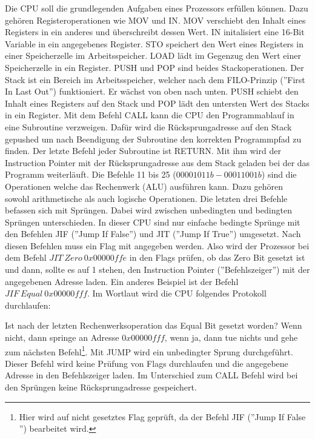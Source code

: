\documentclass[12pt]{article}
\begin{document}
\newpage
\noindent Die CPU soll die grundlegenden Aufgaben eines Prozessors erfüllen können. Dazu gehören Registeroperationen wie MOV und IN. MOV verschiebt den Inhalt eines Registers in ein anderes und überschreibt dessen Wert. IN initalisiert eine 16-Bit Variable in ein angegebenes Register. STO speichert den Wert eines Registers in einer Speicherzelle im Arbeitsspeicher. LOAD lädt im Gegenzug den Wert einer Speicherzelle in ein Register. PUSH und POP sind beides Stackoperationen. Der Stack ist ein Bereich im Arbeitsspeicher, welcher nach dem FILO-Prinzip (''First In Last Out'') funktioniert. Er wächst von oben nach unten. PUSH schiebt den Inhalt eines Registers auf den Stack und POP lädt den untersten Wert des Stacks in ein Register. Mit dem Befehl CALL kann die CPU den Programmablauf in eine Subroutine verzweigen. Dafür wird die Rücksprungadresse auf den Stack gepushed um nach Beendigung der Subroutine den korrekten Programmpfad zu finden. Der letzte Befehl jeder Subroutine ist RETURN. Mit ihm wird der Instruction Pointer mit der Rücksprungadresse aus dem Stack geladen bei der das Programm weiterläuft. Die Befehle 11 bis 25 ($00001011b - 00011001b$) sind die Operationen welche das Rechenwerk (ALU) ausführen kann. Dazu gehören sowohl arithmetische als auch logische Operationen. Die letzten drei Befehle befassen sich mit Sprüngen. Dabei wird zwischen unbedingten und bedingten Sprüngen unterschieden. In dieser CPU sind nur einfache bedingte Sprünge mit den Befehlen JIF (''Jump If False'') und JIT (''Jump If True'') umgesetzt. Nach diesen Befehlen muss ein Flag mit angegeben werden. Also wird der Prozessor bei dem Befehl $JIT \ Zero \ 0x00000ffe$  in den Flags prüfen, ob das Zero Bit gesetzt ist und dann, sollte es auf 1 stehen, den Instruction Pointer (''Befehlszeiger'') mit der angegebenen Adresse laden. Ein anderes Beispiel ist der Befehl $JIF \ Equal \ 0x00000fff$. Im Wortlaut wird die CPU folgendes Protokoll durchlaufen:\par\smallskip\noindent Ist nach der letzten Rechenwerksoperation das Equal Bit gesetzt worden? Wenn nicht, dann springe an Adresse $0x00000fff$, wenn ja, dann tue nichts und gehe zum nächsten Befehl\footnote{Hier wird auf nicht gesetztes Flag geprüft, da der Befehl JIF (''Jump If False '') bearbeitet wird.}. Mit JUMP wird ein unbedingter Sprung durchgeführt. Dieser Befehl wird keine Prüfung von Flags durchlaufen und die angegebene Adresse in den Befehlszeiger laden. Im Unterschied zum CALL Befehl wird bei den Sprüngen keine Rücksprungadresse gespeichert.
\end{document}
